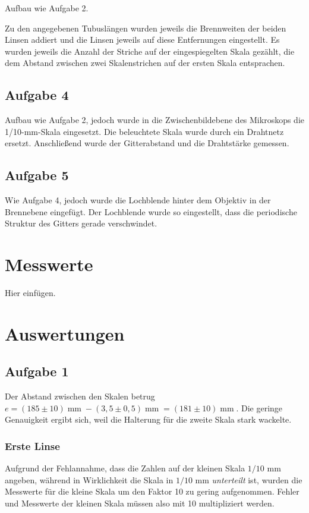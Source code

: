 \documentclass[a4paper,german,12pt,smallheadings]{scrartcl}
\begin{document}
Aufbau wie Aufgabe 2.

Zu den angegebenen Tubuslängen wurden jeweils die Brennweiten der beiden Linsen
addiert und die Linsen jeweils auf diese Entfernungen eingestellt. Es wurden
jeweils die Anzahl der Striche auf der eingespiegelten Skala gezählt, die dem
Abstand zwischen zwei Skalenstrichen auf der ersten Skala entsprachen.

\subsection{Aufgabe 4}

Aufbau wie Aufgabe 2, jedoch wurde in die Zwischenbildebene des Mikroskops die
1/10-mm-Skala eingesetzt. Die beleuchtete Skala wurde durch ein Drahtnetz
ersetzt. Anschließend wurde der Gitterabstand und die Drahtstärke gemessen.

\subsection{Aufgabe 5}

Wie Aufgabe 4, jedoch wurde die Lochblende hinter dem Objektiv in der
Brennebene eingefügt. Der Lochblende wurde so eingestellt, dass die periodische
Struktur des Gitters gerade verschwindet.

\section{Messwerte}
Hier einfügen.

\section{Auswertungen}
\subsection{Aufgabe 1}

Der Abstand zwischen den Skalen betrug $e = (185\pm10) \operatorname{mm} -
(3{,}5\pm0{,}5) \operatorname{mm} = (181\pm10) \operatorname{mm}$. Die geringe
Genauigkeit ergibt sich, weil die Halterung für die zweite Skala stark wackelte.

\subsubsection{Erste Linse}

Aufgrund der Fehlannahme, dass die Zahlen auf der kleinen Skala $1/10$ mm
angeben, während in Wirklichkeit die Skala in $1/10$ mm \textit{unterteilt}
ist, wurden die Messwerte für die kleine Skala um den Faktor 10 zu gering
aufgenommen. Fehler und Messwerte der kleinen Skala müssen also mit 10
multipliziert werden.
\end{document}
